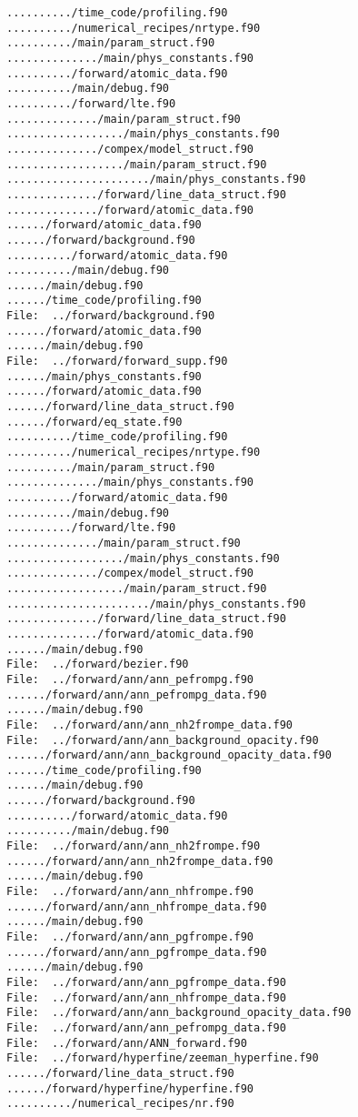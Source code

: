 \begin{verbatim}
........../time_code/profiling.f90
........../numerical_recipes/nrtype.f90
........../main/param_struct.f90
............../main/phys_constants.f90
........../forward/atomic_data.f90
........../main/debug.f90
........../forward/lte.f90
............../main/param_struct.f90
................../main/phys_constants.f90
............../compex/model_struct.f90
................../main/param_struct.f90
....................../main/phys_constants.f90
............../forward/line_data_struct.f90
............../forward/atomic_data.f90
....../forward/atomic_data.f90
....../forward/background.f90
........../forward/atomic_data.f90
........../main/debug.f90
....../main/debug.f90
....../time_code/profiling.f90
File:  ../forward/background.f90
....../forward/atomic_data.f90
....../main/debug.f90
File:  ../forward/forward_supp.f90
....../main/phys_constants.f90
....../forward/atomic_data.f90
....../forward/line_data_struct.f90
....../forward/eq_state.f90
........../time_code/profiling.f90
........../numerical_recipes/nrtype.f90
........../main/param_struct.f90
............../main/phys_constants.f90
........../forward/atomic_data.f90
........../main/debug.f90
........../forward/lte.f90
............../main/param_struct.f90
................../main/phys_constants.f90
............../compex/model_struct.f90
................../main/param_struct.f90
....................../main/phys_constants.f90
............../forward/line_data_struct.f90
............../forward/atomic_data.f90
....../main/debug.f90
File:  ../forward/bezier.f90
File:  ../forward/ann/ann_pefrompg.f90
....../forward/ann/ann_pefrompg_data.f90
....../main/debug.f90
File:  ../forward/ann/ann_nh2frompe_data.f90
File:  ../forward/ann/ann_background_opacity.f90
....../forward/ann/ann_background_opacity_data.f90
....../time_code/profiling.f90
....../main/debug.f90
....../forward/background.f90
........../forward/atomic_data.f90
........../main/debug.f90
File:  ../forward/ann/ann_nh2frompe.f90
....../forward/ann/ann_nh2frompe_data.f90
....../main/debug.f90
File:  ../forward/ann/ann_nhfrompe.f90
....../forward/ann/ann_nhfrompe_data.f90
....../main/debug.f90
File:  ../forward/ann/ann_pgfrompe.f90
....../forward/ann/ann_pgfrompe_data.f90
....../main/debug.f90
File:  ../forward/ann/ann_pgfrompe_data.f90
File:  ../forward/ann/ann_nhfrompe_data.f90
File:  ../forward/ann/ann_background_opacity_data.f90
File:  ../forward/ann/ann_pefrompg_data.f90
File:  ../forward/ann/ANN_forward.f90
File:  ../forward/hyperfine/zeeman_hyperfine.f90
....../forward/line_data_struct.f90
....../forward/hyperfine/hyperfine.f90
........../numerical_recipes/nr.f90

\end{verbatim}
